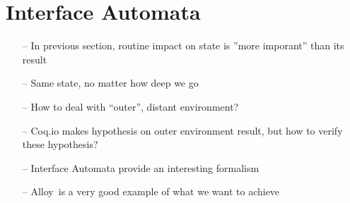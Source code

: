 \section{Interface Automata} %

\begin{itemize}
\item[--] In previous section, routine impact on state is ''more imporant'' than
  its result
\item[--] Same state, no matter how deep we go
\item[--] How to deal with ``outer'', distant environment?
\item[--] Coq.io makes hypothesis on outer environment result, but how to verify
  these hypothesis?
\item[--] Interface Automata provide an interesting formalism
\item[--] Alloy\,\cite{jackson2012alloy} is a very good example of what we want
  to achieve
\end{itemize}

